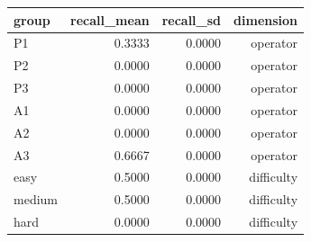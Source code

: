 \begin{tabular}{lrrr}
\hline
group & recall\_mean & recall\_sd & dimension \\
\hline
P1 & 0.3333 & 0.0000 & operator \\
P2 & 0.0000 & 0.0000 & operator \\
P3 & 0.0000 & 0.0000 & operator \\
A1 & 0.0000 & 0.0000 & operator \\
A2 & 0.0000 & 0.0000 & operator \\
A3 & 0.6667 & 0.0000 & operator \\
easy & 0.5000 & 0.0000 & difficulty \\
medium & 0.5000 & 0.0000 & difficulty \\
hard & 0.0000 & 0.0000 & difficulty \\
\hline
\end{tabular}
